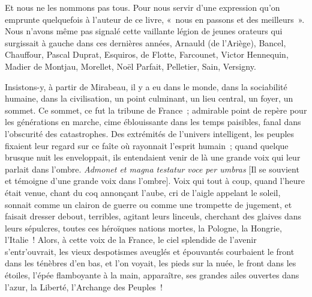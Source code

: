 \documentclass[french,twoside]{book} %
\begin{document}
Et nous ne les nommons pas tous. Pour nous servir d’une expression qu’on emprunte quelquefois à l’auteur de ce livre, « nous en passons et des meilleurs ». Nous n’avons même pas signalé cette vaillante légion de jeunes orateurs qui surgissait à gauche dans ces dernières années, Arnauld (de l’Ariège), Bancel, Chauffour, Pascal Duprat, Esquiros, de Flotte, Farcounet, Victor Hennequin, Madier de Montjau, Morellet, Noël Parfait, Pelletier, Sain, Versigny.\par
Insistons-y, à partir de Mirabeau, il y a eu dans le monde, dans la sociabilité humaine, dans la civilisation, un point culminant, un lieu central, un foyer, un sommet. Ce sommet, ce fut la tribune de France ; admirable point de repère pour les générations en marche, cime éblouissante dans les temps paisibles, fanal dans l’obscurité des catastrophes. Des extrémités de l’univers intelligent, les peuples fixaient leur regard sur ce faîte où rayonnait l’esprit humain ; quand quelque brusque nuit les enveloppait, ils entendaient venir de là une grande voix qui leur parlait dans l’ombre. \emph{Admonet et magna testatur voce per umbras} [Il se souvient et témoigne d’une grande voix dans l’ombre]. Voix qui tout à coup, quand l’heure était venue, chant du coq annonçant l’aube, cri de l’aigle appelant le soleil, sonnait comme un clairon de guerre ou comme une trompette de jugement, et faisait dresser debout, terribles, agitant leurs linceuls, cherchant des glaives dans leurs sépulcres, toutes ces héroïques nations mortes, la Pologne, la Hongrie, l’Italie ! Alors, à cette voix de la France, le ciel splendide de l’avenir s’entr’ouvrait, les vieux despotismes aveuglés et épouvantés courbaient le front dans les ténèbres d’en bas, et l’on voyait, les pieds sur la nuée, le front dans les étoiles, l’épée flamboyante à la main, apparaître, ses grandes ailes ouvertes dans l’azur, la Liberté, l’Archange des Peuples !
\end{document}
